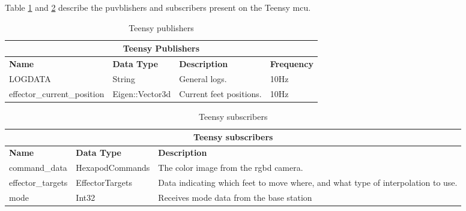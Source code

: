     \newpage
    \noindent
    Table \ref{tab:teensy_pubs} and \ref{tab:teensy_subs} describe the puvblishers and subscribers present on the Teensy \ac{mcu}.
    \begin{table}[h]
        \begin{tabularx}{\textwidth}{| l | l | X | l |}
            \hline
            \multicolumn{4}{|c|}{\textbf{Teensy Publishers}} \\ \hline
            \textbf{Name} & \textbf{Data Type} & \textbf{Description} & \textbf{Frequency} \\ \hline
            LOGDATA & String & General logs. & 10Hz \\ \hline
            effector\_current\_position & Eigen::Vector3d & Current feet positions. & 10Hz \\ \hline
        \end{tabularx}
        \caption{Teensy publishers}
        \label{tab:teensy_pubs}
    \end{table}
    \begin{table}[h]
        \centering
        \begin{tabularx}{\textwidth}{| l | l | X |}
            \hline
            \multicolumn{3}{|c|}{\textbf{Teensy subscribers}} \\ \hline
            \textbf{Name} & \textbf{Data Type} & \textbf{Description} \\ \hline
            command\_data & HexapodCommands & The color image from the \ac{rgbd} camera. \\ \hline
            effector\_targets & EffectorTargets & Data indicating which feet to move where, and what type of interpolation to use.\\ \hline
            mode & Int32 & Receives mode data from the base station \\ \hline
        \end{tabularx}
        \caption{Teensy subscribers}
        \label{tab:teensy_subs}
    \end{table}

